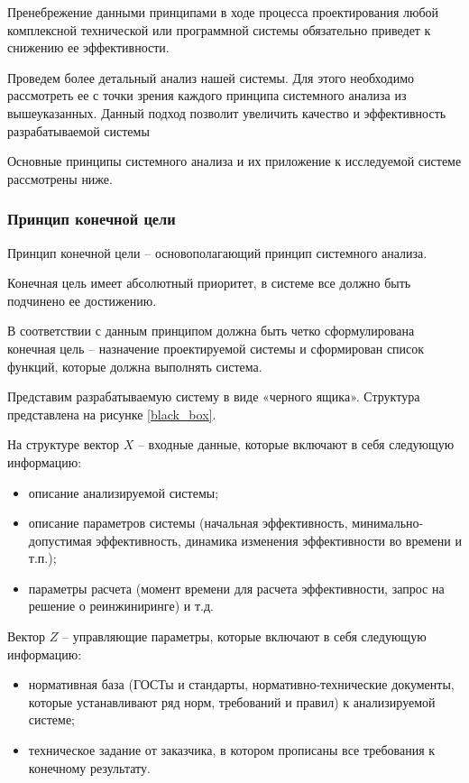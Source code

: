 Пренебрежение данными принципами в ходе процесса проектирования любой комплексной технической или программной системы обязательно приведет к снижению ее эффективности.

Проведем более детальный анализ нашей системы. 
Для этого необходимо рассмотреть ее с точки зрения каждого принципа системного анализа из вышеуказанных. 
Данный подход позволит увеличить качество и эффективность разрабатываемой системы

Основные принципы системного анализа и их приложение к исследуемой системе рассмотрены ниже.

\subsubsection{Принцип конечной цели}
Принцип конечной цели – основополагающий принцип системного анализа.

Конечная цель имеет абсолютный приоритет, в системе все должно быть подчинено ее достижению. 

В соответствии с данным принципом должна быть четко сформулирована конечная цель – назначение проектируемой системы и сформирован список функций, которые должна выполнять система.

Представим разрабатываемую систему в виде «черного ящика». 
Структура представлена на рисунке \ref{black_box}.


На структуре вектор $X$ – входные данные, которые включают в себя следующую информацию:
\begin{itemize}
    \item описание анализируемой системы;
    \item описание параметров системы (начальная эффективность, минимально-допустимая эффективность, динамика изменения эффективности во времени и т.п.);
    \item параметры расчета (момент времени для расчета эффективности, запрос на решение о реинжиниринге) и т.д.
\end{itemize}

Вектор $Z$ – управляющие параметры, которые включают в себя следующую информацию:
\begin{itemize}
    \item нормативная база (ГОСТы и стандарты, нормативно-технические документы, которые устанавливают ряд норм, требований и правил) к анализируемой системе;
    \item техническое задание от заказчика, в котором прописаны все требования к конечному результату.
\end{itemize}
	
